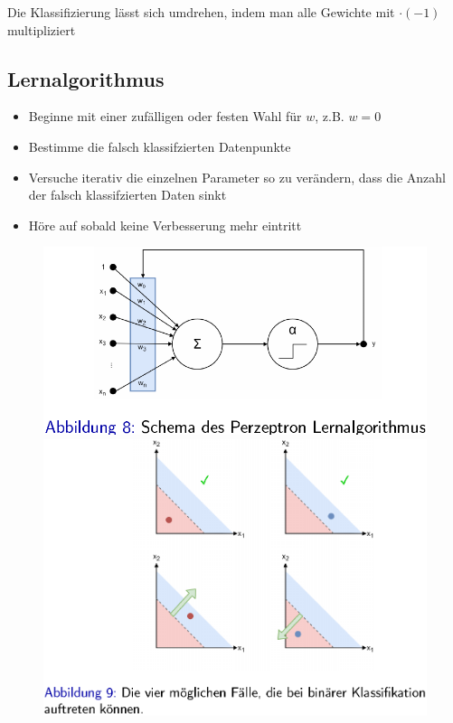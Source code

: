 \documentclass{report}
\begin{document}
  Die Klassifizierung lässt sich umdrehen, indem man alle Gewichte mit $\cdot (-1)$ multipliziert	
  
  \subsection{Lernalgorithmus}	
  \begin{itemize}	
    \item Beginne mit einer zufälligen oder festen Wahl für $w$, z.B. $w = 0$	
    \item Bestimme die falsch klassifzierten Datenpunkte	
    \item Versuche iterativ die einzelnen Parameter so zu verändern, dass die Anzahl der falsch klassifzierten Daten sinkt	
    \item Höre auf sobald keine Verbesserung mehr eintritt	
  \end{itemize}	
  
  \begin{figure}[H]	
    \centering	
    \begin{minipage}[b]{0.4\textwidth}	
      \includegraphics[scale=.25]{ml04_7}	
    \end{minipage}	
    \hfill	
    \begin{minipage}[b]{0.4\textwidth}	
      \includegraphics[scale=.25]{ml04_8}	
    \end{minipage}	
  \end{figure}	
  
\end{document}

